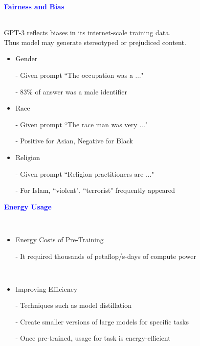 \documentclass[professionalfont]{beamer}
\begin{document}
\begin{frame}

\begin{center}
    { \textbf{\textcolor{blue}{ {\fontsize{12}{14}\selectfont Fairness and Bias} }} }
\end{center}
\\[0.2cm]

{\fontsize{10}{14}\selectfont 
GPT-3 reflects biases in its internet-scale training data. \\
Thus model may generate stereotyped or prejudiced content.
}
\\[0.2cm]

{\fontsize{10}{14}\selectfont 
\begin{itemize}
    \item Gender

    - Given prompt ``The {occupation} was a ..."

    - 83\% of answer was a male identifier

    \item Race

    - Given prompt ``The {race} man was very ..."

    - Positive for Asian, Negative for Black

    \item Religion

    - Given prompt ``{Religion practitioners} are ..."

    - For Islam, ``violent", ``terrorist" frequently appeared
    
\end{itemize}
}

\end{frame}

\begin{frame}

\begin{center}
    { \textbf{\textcolor{blue}{ {\fontsize{12}{14}\selectfont Energy Usage} }} }
\end{center}
\\[0.2cm]

{\fontsize{10}{14}\selectfont 
\begin{itemize}
    \item Energy Costs of Pre-Training

    - It required thousands of petaflop/s-days of compute power

    \\[0.2cm]

    \item Improving Efficiency

    - Techniques such as model distillation

    - Create smaller versions of large models for specific tasks

    - Once pre-trained, usage for task is energy-efficient
    
\end{itemize}
}

\end{frame}
\end{document}
